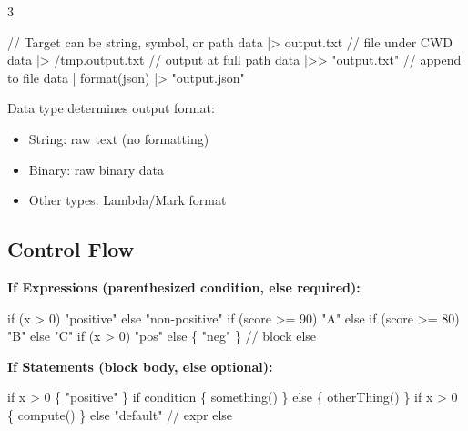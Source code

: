 \documentclass[8pt,landscape,a4paper,oneside]{article}
\newenvironment{Shaded}{%
  \begin{snugshade}%
  \vspace{0.4\baselineskip}%
  \fontsize{9}{10}\selectfont%
  \setlength{\parskip}{0pt}%
  \setlength{\topsep}{0pt}%
  \setlength{\partopsep}{0pt}%
}{%
  \vspace{0.01\baselineskip}%
  \end{snugshade}%
}
\providecommand{\tightlist}{%
  \setlength{\itemsep}{0pt}\setlength{\parskip}{0pt}}
\newcommand{\NormalTok}[1]{#1}
\begin{document}
\begin{multicols*}{3}
\begin{Shaded}
\begin{Highlighting}[]
\NormalTok{// Target can be string, symbol, or path}
\NormalTok{data |\textgreater{} \textquotesingle{}output.txt\textquotesingle{}        // file under CWD}
\NormalTok{data |\textgreater{} /tmp.\textquotesingle{}output.txt\textquotesingle{}   // output at full path}
\NormalTok{data |\textgreater{}\textgreater{} "output.txt"       // append to file}
\NormalTok{data | format(\textquotesingle{}json\textquotesingle{}) |\textgreater{} "output.json"}
\end{Highlighting}
\end{Shaded}

Data type determines output format:

\begin{itemize}
\tightlist
\item
  String: raw text (no formatting)
\item
  Binary: raw binary data
\item
  Other types: Lambda/Mark format
\end{itemize}

\subsection{Control Flow}\label{control-flow}

\textbf{If Expressions (parenthesized condition, else required):}

\begin{Shaded}
\begin{Highlighting}[]
\NormalTok{if (x \textgreater{} 0) "positive" else "non{-}positive"}
\NormalTok{if (score \textgreater{}= 90) "A"}
\NormalTok{else if (score \textgreater{}= 80) "B" else "C"}
\NormalTok{if (x \textgreater{} 0) "pos" else \{ "neg" \} // block else}
\end{Highlighting}
\end{Shaded}

\textbf{If Statements (block body, else optional):}

\begin{Shaded}
\begin{Highlighting}[]
\NormalTok{if x \textgreater{} 0 \{ "positive" \}}
\NormalTok{if condition \{ something() \} else \{ otherThing() \}}
\NormalTok{if x \textgreater{} 0 \{ compute() \} else "default"   // expr else}
\end{Highlighting}
\end{Shaded}


\end{multicols*}
\end{document}
